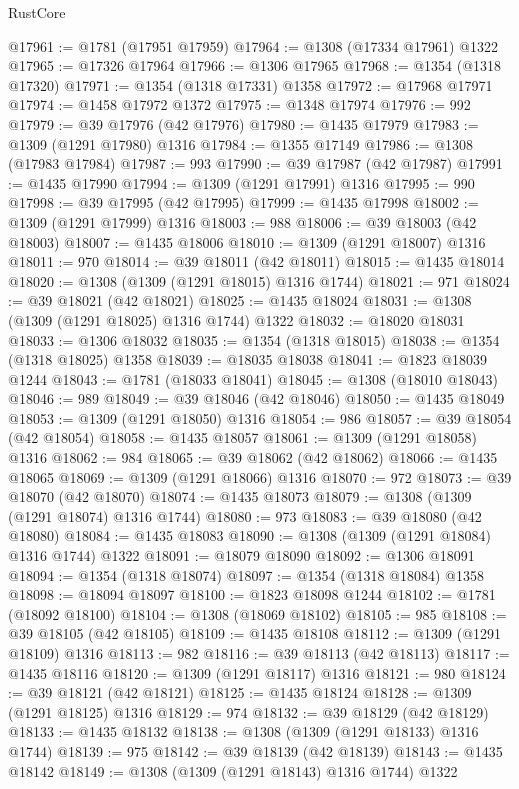 \begin{lexlean}{RustCore}
\begin{coremodule}
@17961 := @1781 (@17951 @17959)
@17964 := @1308 (@17334 @17961) @1322
@17965 := @17326 @17964
@17966 := @1306 @17965
@17968 := @1354 (@1318 @17320)
@17971 := @1354 (@1318 @17331) @1358
@17972 := @17968 @17971
@17974 := @1458 @17972 @1372
@17975 := @1348 @17974
@17976 := 992
@17979 := @39 @17976 (@42 @17976)
@17980 := @1435 @17979
@17983 := @1309 (@1291 @17980) @1316
@17984 := @1355 @17149
@17986 := @1308 (@17983 @17984)
@17987 := 993
@17990 := @39 @17987 (@42 @17987)
@17991 := @1435 @17990
@17994 := @1309 (@1291 @17991) @1316
@17995 := 990
@17998 := @39 @17995 (@42 @17995)
@17999 := @1435 @17998
@18002 := @1309 (@1291 @17999) @1316
@18003 := 988
@18006 := @39 @18003 (@42 @18003)
@18007 := @1435 @18006
@18010 := @1309 (@1291 @18007) @1316
@18011 := 970
@18014 := @39 @18011 (@42 @18011)
@18015 := @1435 @18014
@18020 := @1308 (@1309 (@1291 @18015) @1316 @1744)
@18021 := 971
@18024 := @39 @18021 (@42 @18021)
@18025 := @1435 @18024
@18031 := @1308 (@1309 (@1291 @18025) @1316 @1744) @1322
@18032 := @18020 @18031
@18033 := @1306 @18032
@18035 := @1354 (@1318 @18015)
@18038 := @1354 (@1318 @18025) @1358
@18039 := @18035 @18038
@18041 := @1823 @18039 @1244
@18043 := @1781 (@18033 @18041)
@18045 := @1308 (@18010 @18043)
@18046 := 989
@18049 := @39 @18046 (@42 @18046)
@18050 := @1435 @18049
@18053 := @1309 (@1291 @18050) @1316
@18054 := 986
@18057 := @39 @18054 (@42 @18054)
@18058 := @1435 @18057
@18061 := @1309 (@1291 @18058) @1316
@18062 := 984
@18065 := @39 @18062 (@42 @18062)
@18066 := @1435 @18065
@18069 := @1309 (@1291 @18066) @1316
@18070 := 972
@18073 := @39 @18070 (@42 @18070)
@18074 := @1435 @18073
@18079 := @1308 (@1309 (@1291 @18074) @1316 @1744)
@18080 := 973
@18083 := @39 @18080 (@42 @18080)
@18084 := @1435 @18083
@18090 := @1308 (@1309 (@1291 @18084) @1316 @1744) @1322
@18091 := @18079 @18090
@18092 := @1306 @18091
@18094 := @1354 (@1318 @18074)
@18097 := @1354 (@1318 @18084) @1358
@18098 := @18094 @18097
@18100 := @1823 @18098 @1244
@18102 := @1781 (@18092 @18100)
@18104 := @1308 (@18069 @18102)
@18105 := 985
@18108 := @39 @18105 (@42 @18105)
@18109 := @1435 @18108
@18112 := @1309 (@1291 @18109) @1316
@18113 := 982
@18116 := @39 @18113 (@42 @18113)
@18117 := @1435 @18116
@18120 := @1309 (@1291 @18117) @1316
@18121 := 980
@18124 := @39 @18121 (@42 @18121)
@18125 := @1435 @18124
@18128 := @1309 (@1291 @18125) @1316
@18129 := 974
@18132 := @39 @18129 (@42 @18129)
@18133 := @1435 @18132
@18138 := @1308 (@1309 (@1291 @18133) @1316 @1744)
@18139 := 975
@18142 := @39 @18139 (@42 @18139)
@18143 := @1435 @18142
@18149 := @1308 (@1309 (@1291 @18143) @1316 @1744) @1322

\end{coremodule}
\end{lexlean}
